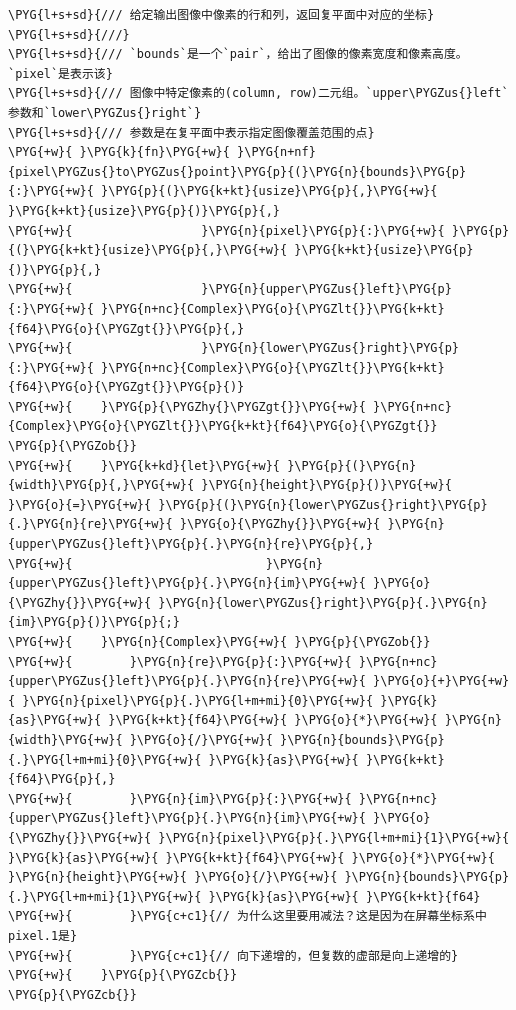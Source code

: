 \begin{Verbatim}[commandchars=\\\{\},breaklines=true,breakanywhere=true,fontsize=\codefont,xleftmargin=17bp]
\PYG{l+s+sd}{/// 给定输出图像中像素的行和列，返回复平面中对应的坐标}
\PYG{l+s+sd}{///}
\PYG{l+s+sd}{/// `bounds`是一个`pair`，给出了图像的像素宽度和像素高度。`pixel`是表示该}
\PYG{l+s+sd}{/// 图像中特定像素的(column, row)二元组。`upper\PYGZus{}left`参数和`lower\PYGZus{}right`}
\PYG{l+s+sd}{/// 参数是在复平面中表示指定图像覆盖范围的点}
\PYG{+w}{ }\PYG{k}{fn}\PYG{+w}{ }\PYG{n+nf}{pixel\PYGZus{}to\PYGZus{}point}\PYG{p}{(}\PYG{n}{bounds}\PYG{p}{:}\PYG{+w}{ }\PYG{p}{(}\PYG{k+kt}{usize}\PYG{p}{,}\PYG{+w}{ }\PYG{k+kt}{usize}\PYG{p}{)}\PYG{p}{,}
\PYG{+w}{                  }\PYG{n}{pixel}\PYG{p}{:}\PYG{+w}{ }\PYG{p}{(}\PYG{k+kt}{usize}\PYG{p}{,}\PYG{+w}{ }\PYG{k+kt}{usize}\PYG{p}{)}\PYG{p}{,}
\PYG{+w}{                  }\PYG{n}{upper\PYGZus{}left}\PYG{p}{:}\PYG{+w}{ }\PYG{n+nc}{Complex}\PYG{o}{\PYGZlt{}}\PYG{k+kt}{f64}\PYG{o}{\PYGZgt{}}\PYG{p}{,}
\PYG{+w}{                  }\PYG{n}{lower\PYGZus{}right}\PYG{p}{:}\PYG{+w}{ }\PYG{n+nc}{Complex}\PYG{o}{\PYGZlt{}}\PYG{k+kt}{f64}\PYG{o}{\PYGZgt{}}\PYG{p}{)}
\PYG{+w}{    }\PYG{p}{\PYGZhy{}\PYGZgt{}}\PYG{+w}{ }\PYG{n+nc}{Complex}\PYG{o}{\PYGZlt{}}\PYG{k+kt}{f64}\PYG{o}{\PYGZgt{}}
\PYG{p}{\PYGZob{}}
\PYG{+w}{    }\PYG{k+kd}{let}\PYG{+w}{ }\PYG{p}{(}\PYG{n}{width}\PYG{p}{,}\PYG{+w}{ }\PYG{n}{height}\PYG{p}{)}\PYG{+w}{ }\PYG{o}{=}\PYG{+w}{ }\PYG{p}{(}\PYG{n}{lower\PYGZus{}right}\PYG{p}{.}\PYG{n}{re}\PYG{+w}{ }\PYG{o}{\PYGZhy{}}\PYG{+w}{ }\PYG{n}{upper\PYGZus{}left}\PYG{p}{.}\PYG{n}{re}\PYG{p}{,}
\PYG{+w}{                           }\PYG{n}{upper\PYGZus{}left}\PYG{p}{.}\PYG{n}{im}\PYG{+w}{ }\PYG{o}{\PYGZhy{}}\PYG{+w}{ }\PYG{n}{lower\PYGZus{}right}\PYG{p}{.}\PYG{n}{im}\PYG{p}{)}\PYG{p}{;}
\PYG{+w}{    }\PYG{n}{Complex}\PYG{+w}{ }\PYG{p}{\PYGZob{}}
\PYG{+w}{        }\PYG{n}{re}\PYG{p}{:}\PYG{+w}{ }\PYG{n+nc}{upper\PYGZus{}left}\PYG{p}{.}\PYG{n}{re}\PYG{+w}{ }\PYG{o}{+}\PYG{+w}{ }\PYG{n}{pixel}\PYG{p}{.}\PYG{l+m+mi}{0}\PYG{+w}{ }\PYG{k}{as}\PYG{+w}{ }\PYG{k+kt}{f64}\PYG{+w}{ }\PYG{o}{*}\PYG{+w}{ }\PYG{n}{width}\PYG{+w}{ }\PYG{o}{/}\PYG{+w}{ }\PYG{n}{bounds}\PYG{p}{.}\PYG{l+m+mi}{0}\PYG{+w}{ }\PYG{k}{as}\PYG{+w}{ }\PYG{k+kt}{f64}\PYG{p}{,}
\PYG{+w}{        }\PYG{n}{im}\PYG{p}{:}\PYG{+w}{ }\PYG{n+nc}{upper\PYGZus{}left}\PYG{p}{.}\PYG{n}{im}\PYG{+w}{ }\PYG{o}{\PYGZhy{}}\PYG{+w}{ }\PYG{n}{pixel}\PYG{p}{.}\PYG{l+m+mi}{1}\PYG{+w}{ }\PYG{k}{as}\PYG{+w}{ }\PYG{k+kt}{f64}\PYG{+w}{ }\PYG{o}{*}\PYG{+w}{ }\PYG{n}{height}\PYG{+w}{ }\PYG{o}{/}\PYG{+w}{ }\PYG{n}{bounds}\PYG{p}{.}\PYG{l+m+mi}{1}\PYG{+w}{ }\PYG{k}{as}\PYG{+w}{ }\PYG{k+kt}{f64}
\PYG{+w}{        }\PYG{c+c1}{// 为什么这里要用减法？这是因为在屏幕坐标系中pixel.1是}
\PYG{+w}{        }\PYG{c+c1}{// 向下递增的，但复数的虚部是向上递增的}
\PYG{+w}{    }\PYG{p}{\PYGZcb{}}
\PYG{p}{\PYGZcb{}}


\end{Verbatim}
